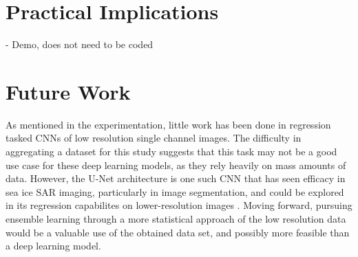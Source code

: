 \section{Practical Implications}
- Demo, does not need to be coded

\section{Future Work}
As mentioned in the experimentation, little work has been done in regression tasked CNNs of low resolution single channel images. The difficulty in aggregating a dataset for this study suggests that this task may not be a good use case for these deep learning models, as they rely heavily on mass amounts of data. However, the U-Net architecture is one such CNN that has seen efficacy in sea ice SAR imaging, particularly in image segmentation, and could be explored in its regression capabilites on lower-resolution images \cite{SAR-U-Net}. Moving forward, pursuing ensemble learning through a more statistical approach of the low resolution data would be a valuable use of the obtained data set, and possibly more feasible than a deep learning model.
